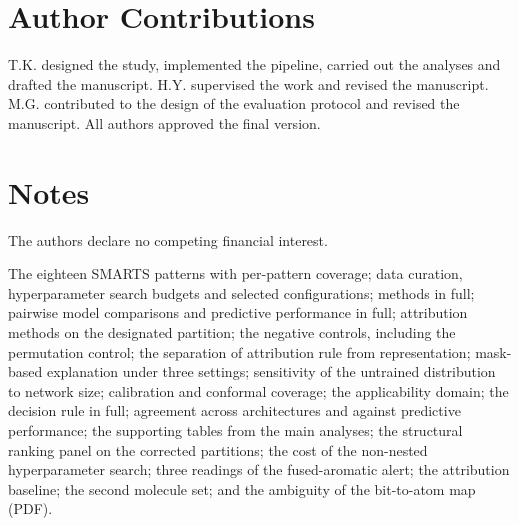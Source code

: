 \documentclass[journal=jcisd8,manuscript=article]{achemso}
\begin{document}
\section*{Author Contributions}
T.K. designed the study, implemented the pipeline, carried out the analyses and drafted the
manuscript. H.Y. supervised the work and revised the manuscript. M.G. contributed to the
design of the evaluation protocol and revised the manuscript. All authors approved the final
version.

\section*{Notes}
The authors declare no competing financial interest.

\begin{suppinfo}
The eighteen SMARTS patterns with per-pattern coverage; data curation, hyperparameter search
budgets and selected configurations; methods in full; pairwise model comparisons and
predictive performance in full; attribution methods on the designated partition; the negative
controls, including the permutation control; the separation of attribution rule from
representation; mask-based explanation under three settings; sensitivity of the untrained
distribution to network size; calibration and conformal coverage; the applicability domain;
the decision rule in full; agreement across architectures and against predictive performance;
the supporting tables from the main analyses; the structural ranking panel on the corrected
partitions; the cost of the non-nested hyperparameter search; three readings of the
fused-aromatic alert; the attribution baseline; the second molecule set; and the ambiguity of
the bit-to-atom map (PDF).
\end{suppinfo}


\end{document}
